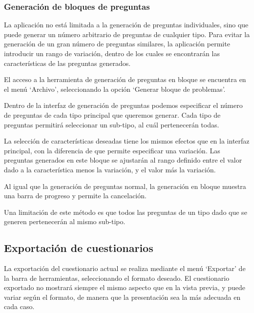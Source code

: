 \subsubsection{Generación de bloques de preguntas}
La aplicación no está limitada a la generación de preguntas individuales, sino que puede generar un número arbitrario de preguntas de cualquier tipo.
Para evitar la generación de un gran número de preguntas similares, la aplicación permite introducir un rango de variación, dentro de los cuales se encontrarán las características de las preguntas generados.

El acceso a la herramienta de generación de preguntas en bloque se encuentra en el menú `Archivo', seleccionando la opción `Generar bloque de problemas'.


Dentro de la interfaz de generación de preguntas podemos especificar el número de preguntas de cada tipo principal que queremos generar.
Cada tipo de preguntas permitirá seleccionar un sub-tipo, al cuál pertenecerán todas.

La selección de características deseadas tiene los mismos efectos que en la interfaz principal, con la diferencia de que permite especificar una variación.
Las preguntas generados en este bloque se ajustarán al rango definido entre el valor dado a la característica menos la variación, y el valor más la variación.


Al igual que la generación de preguntas normal, la generación en bloque muestra una barra de progreso y permite la cancelación.

Una limitación de este método es que todos las preguntas de un tipo dado que se generen pertenecerán al mismo sub-tipo.

\subsection{Exportación de cuestionarios}
La exportación del cuestionario actual se realiza mediante el menú `Exportar' de la barra de herramientas, seleccionando el formato deseado.
El cuestionario exportado no mostrará siempre el mismo aspecto que en la vista previa, y puede variar según el formato, de manera que la presentación sea la más adecuada en cada caso.


